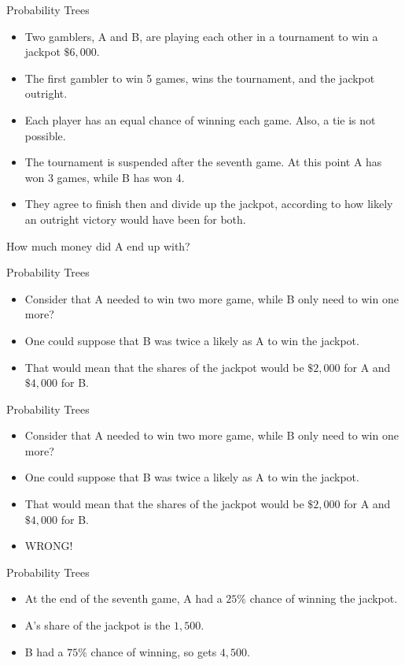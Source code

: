 
{Probability Trees}
{
\normalsize

\begin{itemize}
\item Two gamblers, A and B, are playing each other in a tournament to win a jackpot $\$6,000$.
\item The first gambler to win 5 games, wins the tournament, and the jackpot outright.
\item Each player has an equal chance of winning each game. Also, a tie is not possible.
\item The tournament is suspended after the seventh game. At this point A has won 3 games, while B has won 4.
\item They agree to finish then and divide up the jackpot, according to how likely an outright victory would have been for both.
\end{itemize}
How much money did A end up with?
}



{Probability Trees}
{ \normalsize

\begin{itemize}
\item Consider that A needed to win two more game, while B only need to win one more?
\item One could suppose that B was twice a likely as A to win the jackpot.
\item That would mean that the shares of the jackpot would be $\$2,000$ for A and
$\$4,000$ for B.
\end{itemize}
}


{Probability Trees}
{ \normalsize

\begin{itemize}
\item Consider that A needed to win two more game, while B only need to win one more?
\item One could suppose that B was twice a likely as A to win the jackpot.
\item That would mean that the shares of the jackpot would be $\$2,000$ for A and
$\$4,000$ for B.
\item {WRONG!}
\end{itemize}
}


{Probability Trees}
{  \normalsize

\begin{itemize}
\item At the end of the seventh game, A had a $25\%$ chance of winning the jackpot.
\item A's share of the jackpot is  the $1,500$.
\item B had a $75\%$ chance of winning, so gets $4,500$.
\end{itemize}
}


